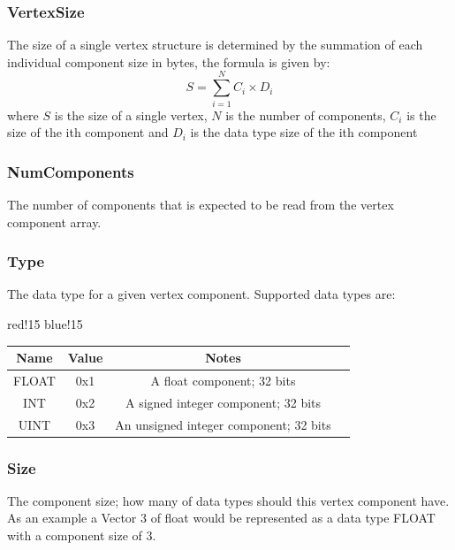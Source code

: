 \subsubsection{VertexSize}
The size of a single vertex structure is determined by the summation of each individual component size in bytes, the formula is given by:
\begin{equation}
    S = \sum_{i=1}^{N} C_i \times D_i
\end{equation}
where $S$ is the size of a single vertex, $N$ is the number of components, $C_i$ is the size of the ith component and $D_i$ is the data type size of the ith component

\subsubsection{NumComponents}
The number of components that is expected to be read from the vertex component array.

\subsubsection{Type}
The data type for a given vertex component. Supported data types are:
\begin{center}
    {
        {red!15}
        {blue!15}
        \begin{tabular}{|c|c|c|c|}
            \hline
            \textbf{Name} & \textbf{Value} & \textbf{Notes} \\

            \hline\hline
            FLOAT & 0x1 & A float component; 32 bits \\
            INT & 0x2 & A signed integer component; 32 bits \\
            UINT & 0x3 & An unsigned integer component; 32 bits \\
            \hline
        \end{tabular}
    }
\end{center}

\subsubsection{Size}
The component size; how many of data types should this vertex component have. As an example a Vector 3 of float would be represented as a data type FLOAT with a component size of 3.

